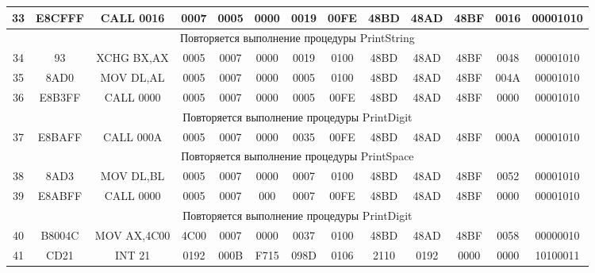 \begin{tabular}{|c|c|c|c|c|c|c|c|c|c|c|c|c|}
	33 & E8CFFF & CALL 0016 & 0007 & 0005 & 0000 & 0019 & 00FE & 48BD & 48AD & 48BF & 0016 & 00001010 \\
\hline
	\multicolumn{13}{|c|}{Повторяется выполнение процедуры PrintString} \\
\hline
	34 & 93 & XCHG BX,AX & 0005 & 0007 & 0000 & 0019 & 0100 & 48BD & 48AD & 48BF & 0048 & 00001010 \\
\hline
	35 & 8AD0 & MOV DL,AL & 0005 & 0007 & 0000 & 0005 & 0100 & 48BD & 48AD & 48BF & 004A & 00001010 \\
\hline
	36 & E8B3FF & CALL 0000 & 0005 & 0007 & 0000 & 0005 & 00FE & 48BD & 48AD & 48BF & 0000 & 00001010 \\
\hline
	\multicolumn{13}{|c|}{Повторяется выполнение процедуры PrintDigit} \\
\hline
	37 & E8BAFF & CALL 000A & 0005 & 0007 & 0000 & 0035 & 00FE & 48BD & 48AD & 48BF & 000A & 00001010 \\
\hline
	\multicolumn{13}{|c|}{Повторяется выполнение процедуры PrintSpace} \\
\hline
	38 & 8AD3 & MOV DL,BL & 0005 & 0007 & 0000 & 0007 & 0100 & 48BD & 48AD & 48BF & 0052 & 00001010 \\
\hline
	39 & E8ABFF & CALL 0000 & 0005 & 0007 & 000 & 0007 & 00FE & 48BD & 48AD & 48BF & 0000 & 00001010 \\
\hline
	\multicolumn{13}{|c|}{Повторяется выполнение процедуры PrintDigit} \\
\hline
	40 & B8004C & MOV AX,4C00 & 4C00 & 0007 & 0000 & 0037 & 0100 & 48BD & 48AD & 48BF & 0058 & 00000010 \\
\hline
	41 & CD21 & INT 21 & 0192 & 000B & F715 & 098D & 0106 & 2110 & 0192 & 0000 & 0000 & 10100011 \\
\hline
\end{tabular}

